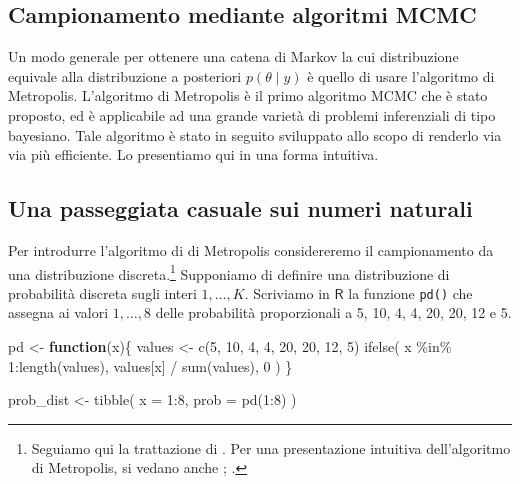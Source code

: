 \documentclass[
  10pt,
  italian,
  a4paper,
  extrafontsizes,onecolumn,openright
  ]{memoir}
\newenvironment{Shaded}{\begin{snugshade}}{\end{snugshade}}
\newcommand{\AttributeTok}[1]{\textcolor[rgb]{0.77,0.63,0.00}{#1}}
\newcommand{\ControlFlowTok}[1]{\textcolor[rgb]{0.13,0.29,0.53}{\textbf{#1}}}
\newcommand{\DecValTok}[1]{\textcolor[rgb]{0.00,0.00,0.81}{#1}}
\newcommand{\FunctionTok}[1]{\textcolor[rgb]{0.00,0.00,0.00}{#1}}
\newcommand{\NormalTok}[1]{#1}
\newcommand{\OtherTok}[1]{\textcolor[rgb]{0.56,0.35,0.01}{#1}}
\newcommand{\SpecialCharTok}[1]{\textcolor[rgb]{0.00,0.00,0.00}{#1}}
\newcommand{\R}{\textsf{R}} %
\begin{document}
\hypertarget{campionamento-mediante-algoritmi-mcmc}{%
\subsection{Campionamento mediante algoritmi MCMC}\label{campionamento-mediante-algoritmi-mcmc}}

Un modo generale per ottenere una catena di Markov la cui distribuzione equivale alla distribuzione a posteriori \(p(\theta \mid y)\) è quello di usare l'algoritmo di Metropolis. L'algoritmo di Metropolis è il primo algoritmo MCMC che è stato proposto, ed è applicabile ad una grande varietà di problemi inferenziali di tipo bayesiano. Tale algoritmo è stato in seguito sviluppato allo scopo di renderlo via via più efficiente. Lo presentiamo qui in una forma intuitiva.

\hypertarget{una-passeggiata-casuale-sui-numeri-naturali}{%
\subsection{Una passeggiata casuale sui numeri naturali}\label{una-passeggiata-casuale-sui-numeri-naturali}}

Per introdurre l'algoritmo di di Metropolis considereremo il campionamento da una distribuzione discreta.\footnote{Seguiamo qui la trattazione di \textcite{albert2019probability}. Per una presentazione intuitiva dell'algoritmo di Metropolis, si vedano anche \textcite{doing_bayesian_data_an}; \textcite{McElreath_rethinking}.} Supponiamo di definire una distribuzione di probabilità discreta sugli interi \(1,\dots, K\). Scriviamo in \(\R\) la funzione \texttt{pd()} che assegna ai valori \(1,\dots, 8\) delle probabilità proporzionali a 5, 10, 4, 4, 20, 20, 12 e 5.

\begin{Shaded}
\begin{Highlighting}[]
\NormalTok{pd }\OtherTok{\textless{}{-}} \ControlFlowTok{function}\NormalTok{(x)\{}
\NormalTok{  values }\OtherTok{\textless{}{-}} \FunctionTok{c}\NormalTok{(}\DecValTok{5}\NormalTok{, }\DecValTok{10}\NormalTok{, }\DecValTok{4}\NormalTok{, }\DecValTok{4}\NormalTok{, }\DecValTok{20}\NormalTok{, }\DecValTok{20}\NormalTok{, }\DecValTok{12}\NormalTok{, }\DecValTok{5}\NormalTok{)}
  \FunctionTok{ifelse}\NormalTok{(}
\NormalTok{    x }\SpecialCharTok{\%in\%} \DecValTok{1}\SpecialCharTok{:}\FunctionTok{length}\NormalTok{(values),}
\NormalTok{    values[x] }\SpecialCharTok{/} \FunctionTok{sum}\NormalTok{(values),}
    \DecValTok{0}
\NormalTok{  )}
\NormalTok{\}}

\NormalTok{prob\_dist }\OtherTok{\textless{}{-}} \FunctionTok{tibble}\NormalTok{(}
  \AttributeTok{x =} \DecValTok{1}\SpecialCharTok{:}\DecValTok{8}\NormalTok{,}
  \AttributeTok{prob =} \FunctionTok{pd}\NormalTok{(}\DecValTok{1}\SpecialCharTok{:}\DecValTok{8}\NormalTok{)}
\NormalTok{)}
\end{Highlighting}
\end{Shaded}
\end{document}
